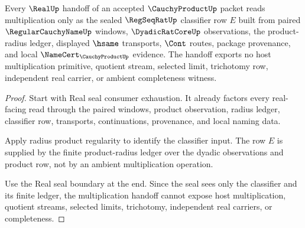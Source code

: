 \begin{theorem}
\label{thm:cauchy-product-real-multiplication-seal-handoff}
Every $\RealUp$ handoff of an accepted $\CauchyProductUp$ packet reads multiplication only as the sealed $\RegSeqRatUp$ classifier row $E$ built from paired $\RegularCauchyNameUp$ windows, $\DyadicRatCoreUp$ observations, the product-radius ledger, displayed $\hsame$ transports, $\Cont$ routes, package provenance, and local $\NameCert_{\CauchyProductUp}$ evidence. The handoff exports no host multiplication primitive, quotient stream, selected limit, trichotomy row, independent real carrier, or ambient completeness witness.
\end{theorem}
\begin{proof}
Start with Real seal consumer exhaustion. It already factors every real-facing read through the paired windows, product observation, radius ledger, classifier row, transports, continuations, provenance, and local naming data.

Apply radius product regularity to identify the classifier input. The row $E$ is supplied by the finite product-radius ledger over the dyadic observations and product row, not by an ambient multiplication operation.

Use the Real seal boundary at the end. Since the seal sees only the classifier and its finite ledger, the multiplication handoff cannot expose host multiplication, quotient streams, selected limits, trichotomy, independent real carriers, or completeness.
\end{proof}

